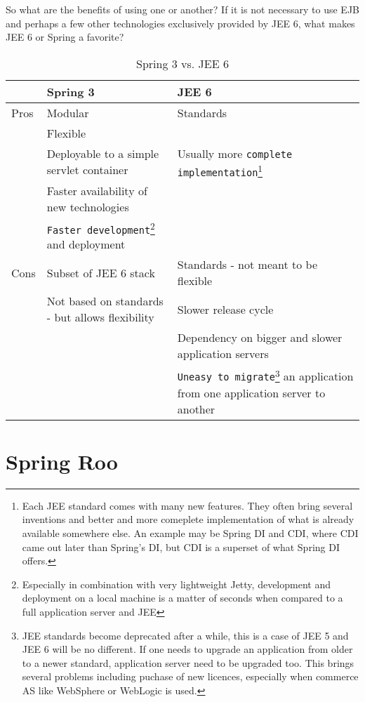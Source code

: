 	So what are the benefits of using one or another? If it is not necessary to use EJB and perhaps a few other
	technologies exclusively provided by JEE 6, what makes JEE 6 or Spring a favorite?

	\begin{table}[h]\centering
	 	\begin{minipage}{12.9cm}
		\begin{tabular}{p{1cm}|p{5.2cm}|p{5.2cm}}
		\hline
		& Spring 3 & JEE 6\\
		\hline
		Pros & Modular & Standards \\
			 & Flexible &  \\
			 & Deployable to a simple servlet container & Usually more \verb|complete implementation|\footnote{Each JEE standard
			 comes with many new features. They often bring several inventions and better and more comeplete
			 implementation of what is already available somewhere else. An example may be Spring DI and CDI, where CDI
			 came out later than Spring's DI, but CDI is a superset of what Spring DI offers.}
			 \\
			 & Faster availability of new technologies &  \\
			 & \verb|Faster development|\footnote{Especially in combination with very lightweight Jetty, development and
			 deployment on a local machine is a matter of seconds when compared to a full application server and JEE} and
			 deployment & \\
		\hline
		Cons & Subset of JEE 6 stack & Standards - not meant to be flexible \\
			 & Not based on standards - but allows flexibility & Slower release cycle \\
			 & & Dependency on bigger and slower application servers \\
			 & & \verb|Uneasy to migrate|\footnote{JEE standards become deprecated after a while, this is a case of JEE 5 and
			 JEE 6 will be no different. If one needs to upgrade an application from older to a newer standard, application
			 server need to be upgraded too. This brings several problems including puchase of new licences, especially when
			 commerce AS like WebSphere or WebLogic is used.} an application from one application server to another
			 \\
		\end{tabular}
	    \renewcommand{\footnoterule}{}
	    \end{minipage}
	\caption{Spring 3 vs. JEE 6}
	\label{tab:jee6_vs_spring_3}
	\end{table}
	
	\section{Spring Roo}
		